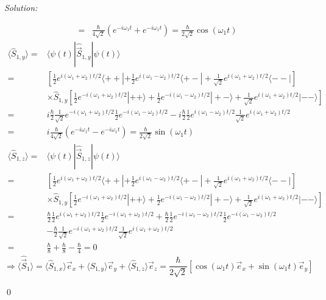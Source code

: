 \documentclass[12pt,a4paper]{article}
\newenvironment{sol}
    {\emph{Solution:}
    }
    {
    \qed
    }
\begin{document}
\begin{sol}
\begin{itemize}
\begin{align}
=&\frac{\hbar}{4\sqrt{2}}(e^{-i\omega_1t}+e^{-i\omega_1t})=\frac{\hbar}{2\sqrt{2}}\cos(\omega_1t)
\end{align}
\begin{align}
\nonumber\langle\hat{S}_{1,y}\rangle=&\langle\psi(t)|\hat{\vec{S}}_{1,y}|\psi(t)\rangle\\
\nonumber=&[\frac{1}{2}e^{i(\omega_1+\omega_2)t/2}\langle++|+\frac{1}{2}e^{i(\omega_1-\omega_2)t/2}\langle+-|+\frac{1}{\sqrt{2}}e^{i(\omega_1+\omega_2)t/2}\langle--|]\\
\nonumber&\times\hat{S}_{1,y}[\frac{1}{2}e^{-i(\omega_1+\omega_2)t/2}|++\rangle+\frac{1}{2}e^{-i(\omega_1-\omega_2)t/2}|+-\rangle+\frac{1}{\sqrt{2}}e^{i(\omega_1+\omega_2)t/2}|--\rangle]\\
\nonumber=&i\frac{\hbar}{2}\frac{1}{\sqrt{2}}e^{-i(\omega_1+\omega_2)t/2}\frac{1}{2}e^{-i(\omega_1-\omega_2)t/2}-i\frac{\hbar}{2}\frac{1}{2}e^{i(\omega_1-\omega_2)t/2}\frac{1}{\sqrt{2}}e^{i(\omega_1+\omega_2)t/2}\\
=&i\frac{\hbar}{4\sqrt{2}}(e^{-i\omega_1t}-e^{-i\omega_1t})=\frac{\hbar}{2\sqrt{2}}\sin(\omega_1t)
\end{align}
\begin{align}
\nonumber\langle\hat{S}_{1,z}\rangle=&\langle\psi(t)|\hat{\vec{S}}_{1,z}|\psi(t)\rangle\\
\nonumber=&[\frac{1}{2}e^{i(\omega_1+\omega_2)t/2}\langle++|+\frac{1}{2}e^{i(\omega_1-\omega_2)t/2}\langle+-|+\frac{1}{\sqrt{2}}e^{i(\omega_1+\omega_2)t/2}\langle--|]\\
\nonumber&\times\hat{S}_{1,y}[\frac{1}{2}e^{-i(\omega_1+\omega_2)t/2}|++\rangle+\frac{1}{2}e^{-i(\omega_1-\omega_2)t/2}|+-\rangle+\frac{1}{\sqrt{2}}e^{i(\omega_1+\omega_2)t/2}|--\rangle]\\
\nonumber=&\frac{\hbar}{2}\frac{1}{2}e^{i(\omega_1+\omega_2)t/2}\frac{1}{2}e^{-i(\omega_1+\omega_2)t/2}+\frac{\hbar}{2}\frac{1}{2}e^{-i(\omega_1-\omega_2)t/2}\frac{1}{2}e^{-i(\omega_1-\omega_2)t/2}\\
\nonumber&-\frac{\hbar}{2}\frac{1}{\sqrt{2}}e^{-i(\omega_1+\omega_2)t/2}\frac{1}{\sqrt{2}}e^{i(\omega_1+\omega_2)t/2}\\
=&\frac{\hbar}{8}+\frac{\hbar}{8}-\frac{\hbar}{4}=0
\end{align}
\begin{equation}
\Longrightarrow\langle\hat{\vec{S}}_1\rangle=\langle\hat{S}_{1,x}\rangle\vec{e}_x+\langle\hat{S}_{1,y}\rangle\vec{e}_y+\langle\hat{S}_{1,z}\rangle\vec{e}_z=\frac{\hbar}{2\sqrt{2}}[\cos(\omega_1t)\vec{e}_x+\sin(\omega_1t)\vec{e}_y]
\end{equation}

\end{itemize}
\end{sol}
\end{document}
